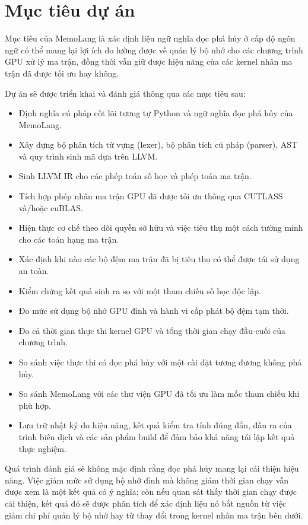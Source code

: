 \documentclass[a4paper]{article}
\begin{document}
	\section{Mục tiêu dự án}
	
	Mục tiêu của MemoLang là xác định liệu ngữ nghĩa đọc phá hủy ở cấp độ ngôn ngữ có thể mang lại lợi ích đo lường được về quản lý bộ nhớ cho các chương trình GPU xử lý ma trận, đồng thời vẫn giữ được hiệu năng của các kernel nhân ma trận đã được tối ưu hay không.
	
	Dự án sẽ được triển khai và đánh giá thông qua các mục tiêu sau:
	
	\begin{itemize}
		\item Định nghĩa cú pháp cốt lõi tương tự Python và ngữ nghĩa đọc phá hủy của MemoLang.
		\item Xây dựng bộ phân tích từ vựng (lexer), bộ phân tích cú pháp (parser), AST và quy trình sinh mã dựa trên LLVM.
		\item Sinh LLVM IR cho các phép toán số học và phép toán ma trận.
		\item Tích hợp phép nhân ma trận GPU đã được tối ưu thông qua CUTLASS và/hoặc cuBLAS.
		\item Hiện thực cơ chế theo dõi quyền sở hữu và việc tiêu thụ một cách tường minh cho các toán hạng ma trận.
		\item Xác định khi nào các bộ đệm ma trận đã bị tiêu thụ có thể được tái sử dụng an toàn.
		\item Kiểm chứng kết quả sinh ra so với một tham chiếu số học độc lập.
		\item Đo mức sử dụng bộ nhớ GPU đỉnh và hành vi cấp phát bộ đệm tạm thời.
		\item Đo cả thời gian thực thi kernel GPU và tổng thời gian chạy đầu-cuối của chương trình.
		\item So sánh việc thực thi có đọc phá hủy với một cài đặt tương đương không phá hủy.
		\item So sánh MemoLang với các thư viện GPU đã tối ưu làm mốc tham chiếu khi phù hợp.
		\item Lưu trữ nhật ký đo hiệu năng, kết quả kiểm tra tính đúng đắn, đầu ra của trình biên dịch và các sản phẩm build để đảm bảo khả năng tái lập kết quả thực nghiệm.
	\end{itemize}
	
	Quá trình đánh giá sẽ không mặc định rằng đọc phá hủy mang lại cải thiện hiệu năng. Việc giảm mức sử dụng bộ nhớ đỉnh mà không giảm thời gian chạy vẫn được xem là một kết quả có ý nghĩa; còn nếu quan sát thấy thời gian chạy được cải thiện, kết quả đó sẽ được phân tích để xác định liệu nó bắt nguồn từ việc giảm chi phí quản lý bộ nhớ hay từ thay đổi trong kernel nhân ma trận bên dưới.
	
\end{document}
